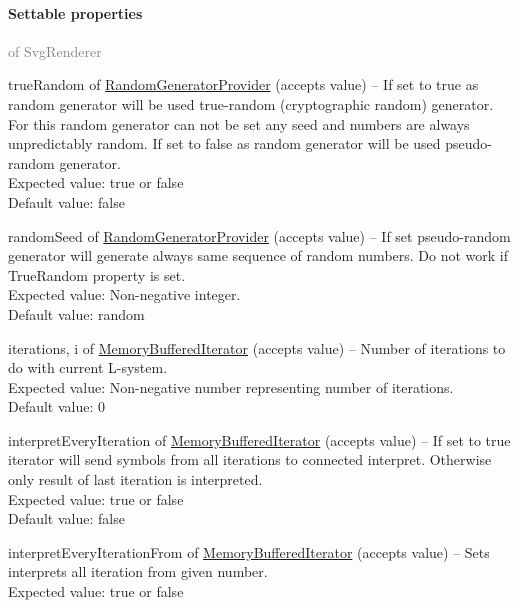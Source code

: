 	\paragraph{Settable properties}\textcolor{gray}{of SvgRenderer}
	\begin{description*}
		\item[trueRandom] of \hyperref[Malsys.Processing.Components.Common.RandomGeneratorProvider]{RandomGeneratorProvider}
		(accepts value)
			-- If set to true as random generator will be used
            true-random (cryptographic random) generator.
            For this random generator can not be set any seed and numbers are
            always unpredictably random.
            If set to false as random generator will be used pseudo-random generator.
			\\ Expected value: true or false
			\\ Default value: false
		\item[randomSeed] of \hyperref[Malsys.Processing.Components.Common.RandomGeneratorProvider]{RandomGeneratorProvider}
		(accepts value)
			-- If set pseudo-random generator will generate always same sequence of random numbers.
            Do not work if TrueRandom property is set.
			\\ Expected value: Non-negative integer.
			\\ Default value: random
		\item[iterations, i] of \hyperref[Malsys.Processing.Components.RewriterIterators.MemoryBufferedIterator]{MemoryBufferedIterator}
		(accepts value)
			-- Number of iterations to do with current L-system.
			\\ Expected value: Non-negative number representing number of iterations.
			\\ Default value: 0
		\item[interpretEveryIteration] of \hyperref[Malsys.Processing.Components.RewriterIterators.MemoryBufferedIterator]{MemoryBufferedIterator}
		(accepts value)
			-- If set to true iterator will send symbols from all iterations to connected interpret.
            Otherwise only result of last iteration is interpreted.
			\\ Expected value: true or false
			\\ Default value: false
		\item[interpretEveryIterationFrom] of \hyperref[Malsys.Processing.Components.RewriterIterators.MemoryBufferedIterator]{MemoryBufferedIterator}
		(accepts value)
			-- Sets interprets all iteration from given number.
			\\ Expected value: true or false

\end{description*}

